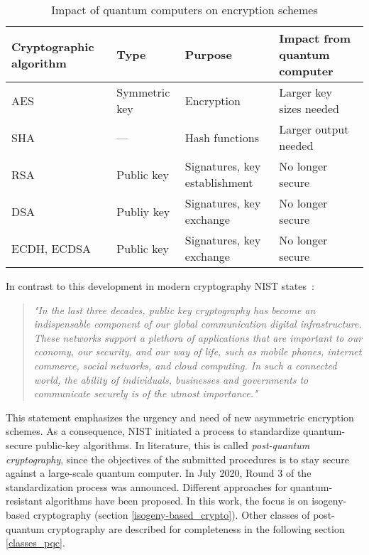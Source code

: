 \begin{table}[htpb]
  \caption[Impact of quantum computers on encryption schemes]{Impact of quantum computers on encryption schemes}\label{tab:impact}
  \centering
  \begin{tabular}{|K{3cm}|K{3cm}|K{4cm}|K{4cm}|}
	\hline
      \textbf{Cryptographic} \textbf{algorithm} & \textbf{Type} & \textbf{Purpose} & \textbf{Impact from} \textbf{ quantum computer} \\
	\hline
      AES & Symmetric key & Encryption & Larger key sizes needed \\
    \hline
      SHA & --- & Hash functions & Larger output needed \\
    \hline
      RSA & Public key & Signatures, key establishment & No longer secure \\
	\hline      
      DSA & Publiy key & Signatures, key exchange & No longer secure \\
    \hline
      ECDH, ECDSA & Public key & Signatures, key exchange & No longer secure \\
    \hline
  \end{tabular}
\end{table}

In contrast to this development in modern cryptography NIST states~\parencite{chen2016report}:
\begin{quote}
\textit{"In the last three decades, public key cryptography has become an indispensable component of our global communication digital infrastructure. These networks support a plethora of applications that are important to our economy, our security, and our way of life, such as mobile phones, internet commerce, social networks, and cloud computing. In such a connected world, the ability of individuals, businesses and governments to communicate securely is of the utmost importance."}
\end{quote}
This statement emphasizes the urgency and need of new asymmetric encryption schemes. As a consequence, NIST initiated a process to standardize quantum-secure public-key algorithms. In literature, this is called \textit{post-quantum cryptography}, since the objectives of the submitted procedures is to stay secure against a large-scale quantum computer. In July 2020, Round 3 of the standardization process was announced. Different approaches for quantum-resistant algorithms have been proposed. In this work, the focus is on isogeny-based cryptography (section \ref{isogeny-based_crypto}). Other classes of post-quantum cryptography are described for completeness in the following section \ref{classes_pqc}.

